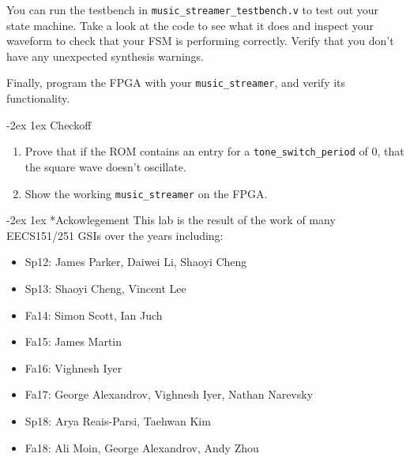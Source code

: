 \documentclass[11pt]{article}
\makeatletter
\renewcommand{\section}
{\@startsection {section}{1}{0pt}
 {-2ex}
 {1ex}
 {\bfseries\Large}}
\makeatother
\begin{document}
You can run the testbench in \verb|music_streamer_testbench.v| to test out your state machine. Take a look at the code to see what it does and inspect your waveform to check that your FSM is performing correctly. Verify that you don't have any unexpected synthesis warnings.

Finally, program the FPGA with your \verb|music_streamer|, and verify its functionality.

\section{Checkoff}
\begin{enumerate}
  \item Prove that if the ROM contains an entry for a \verb|tone_switch_period| of 0, that the square wave doesn't oscillate.
  \item Show the working \verb|music_streamer| on the FPGA.
\end{enumerate}

\section*{Ackowlegement}
This lab is the result of the work of many EECS151/251 GSIs over the years including:
\begin{itemize}
\item Sp12: James Parker, Daiwei Li, Shaoyi Cheng
\item Sp13: Shaoyi Cheng, Vincent Lee
\item Fa14: Simon Scott, Ian Juch
\item Fa15: James Martin
\item Fa16: Vighnesh Iyer
\item Fa17: George Alexandrov, Vighnesh Iyer, Nathan Narevsky
\item Sp18: Arya Reais-Parsi, Taehwan Kim
\item Fa18: Ali Moin, George Alexandrov, Andy Zhou
\end{itemize}
\end{document}
